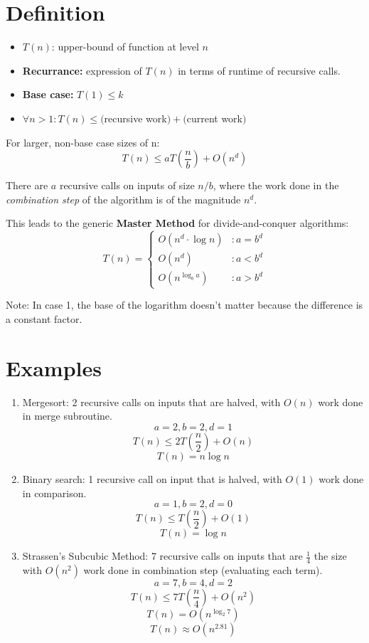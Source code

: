 \documentclass[11pt]{article}
\begin{document}
\section{Definition}
	\begin{itemize}
		\item $T(n)$: upper-bound of function at level $n$
		\item \textbf{Recurrance:} expression of $T(n)$ in terms of runtime of recursive calls.
		\item \textbf{Base case:} $T(1) \leq k$
		\item $\forall n > 1: T(n) \leq ($recursive work$) + ($current work$)$
	\end{itemize}
	
	For larger, non-base case sizes of n:
	\begin{equation}
		T(n)\leq aT\left(\frac{n}{b}\right) + O(n^d)	
	\end{equation}
	
	There are $a$ recursive calls on inputs of size $n/b$, where the work done in the \emph{combination step} of the algorithm is of the magnitude $n^d$.
	
	This leads to the generic \textbf{Master Method} for divide-and-conquer algorithms:
	\begingroup
	\renewcommand*{\arraystretch}{1.5}
	\large
	\begin{equation}
		T(n) = \left\{
			\begin{array}{lr}
				O(n^d\cdot \log n) & : a = b^d\\
				O(n^d) & : a < b^d\\
				O(n^{\log_b a}) & : a > b^d
			\end{array}\right.
	\end{equation}
	\endgroup
	
	Note: In case 1, the base of the logarithm doesn't matter because the difference is a constant factor.
	
\section{Examples}
	\begin{enumerate}
		\item Mergesort: 2 recursive calls on inputs that are halved, with $O(n)$ work done in merge subroutine.
			\[a=2, b=2, d=1\] 
			\[T(n)\leq 2T\left(\frac{n}{2}\right) + O(n)\]
			\[T(n) = n\log n\]
		\item Binary search: 1 recursive call on input that is halved, with $O(1)$ work done in comparison.
			\[a=1,b=2,d=0\]
			\[T(n)\leq T\left(\frac{n}{2}\right) + O(1)\]
			\[T(n) = \log n\]
		\item Strassen's Subcubic Method: 7 recursive calls on inputs that are $\frac{1}{4}$ the size with $O(n^2)$ work done in combination step (evaluating each term).
			\[a=7,b=4,d=2\]
			\[T(n)\leq 7T\left(\frac{n}{4}\right) + O(n^2)\]
			\[T(n) = O\left(n^{\log_2 7}\right)\]
			\[T(n) \approx O\left(n^{2.81}\right)\]
	\end{enumerate}
	
\end{document}
